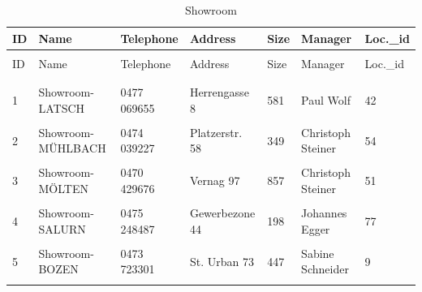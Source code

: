 \documentclass[letterpaper,12pt]{article}
\begin{document}
\begingroup
\renewcommand\arraystretch{0.5}
\begin{longtable}{p{0.25cm}p{3.9cm}p{2.2cm}p{2.9cm}p{.7cm}p{3.1cm}p{1.1cm}}
        \caption{Showroom} \\
        ID & Name & Telephone & Address & Size & Manager & Loc.\_id \\
        \endfirsthead \\
        ID & Name & Telephone & Address & Size & Manager & Loc.\_id \\
        \endhead \\
        \hline \\
        1 & Showroom-LATSCH & 0477 069655 & Herrengasse 8 & 581 & Paul Wolf & 42 \\
        \hline \\
        2 & Showroom-M{\"U}HLBACH & 0474 039227 & Platzerstr. 58 & 349 & Christoph Steiner & 54 \\
        \hline \\
        3 & Showroom-M{\"O}LTEN & 0470 429676 & Vernag 97 & 857 & Christoph Steiner & 51 \\
        \hline \\
        4 & Showroom-SALURN & 0475 248487 & Gewerbezone 44 & 198 & Johannes Egger & 77 \\
        \hline \\
        \color{red} 5 & \color{red} Showroom-BOZEN & 0473 723301 & St. Urban 73 & 447 & Sabine Schneider & 9 \\
        \hline \\
\end{longtable} 
\endgroup
\end{document}
